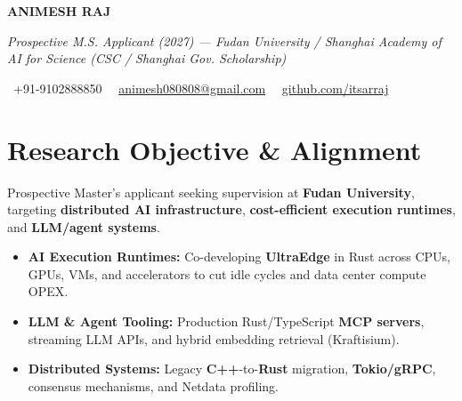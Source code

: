 \documentclass[a4paper,11pt]{article}
\newcommand{\socialicon}[1]{\raisebox{-0.05em}{\resizebox{!}{1em}{#1}}}
\newcommand{\headerfontiii}{\fontfamily{ppl}\selectfont} %
\begin{document}
\headerfontiii

\begin{center}
    {\Huge\textbf{ANIMESH RAJ}}
\end{center}
\vspace{-6mm}

\begin{center}
    {\small\textit{Prospective M.S. Applicant (2027) --- Fudan University / Shanghai Academy of AI for Science (CSC / Shanghai Gov. Scholarship)}}
\end{center}
\vspace{-6mm}

\begin{center}
    {\small
    \socialicon{\faPhone}\ +91-9102888850 \textbar\ 
    \socialicon{\faEnvelope}\ \href{mailto:animesh080808@gmail.com}{animesh080808@gmail.com} \textbar\ 
    \socialicon{\faGithub}\ \href{https://github.com/itsarraj}{github.com/itsarraj}
    }
\end{center}
\vspace{-4mm}

\section{\textbf{Research Objective \& Alignment}}
\vspace{1mm}
{\small
Prospective Master's applicant seeking supervision at \textbf{Fudan University}, targeting \textbf{distributed AI infrastructure}, \textbf{cost-efficient execution runtimes}, and \textbf{LLM/agent systems}.
\begin{itemize}[leftmargin=3ex, itemsep=0.4mm, topsep=1mm]
    \item \textbf{AI Execution Runtimes:} Co-developing \textbf{UltraEdge} in Rust across CPUs, GPUs, VMs, and accelerators to cut idle cycles and data center compute OPEX.
    \item \textbf{LLM \& Agent Tooling:} Production Rust/TypeScript \textbf{MCP servers}, streaming LLM APIs, and hybrid embedding retrieval (Kraftisium).
    \item \textbf{Distributed Systems:} Legacy \textbf{C++}-to-\textbf{Rust} migration, \textbf{Tokio/gRPC}, consensus mechanisms, and Netdata profiling.
\end{itemize}
}
\vspace{-3mm}
\end{document}
